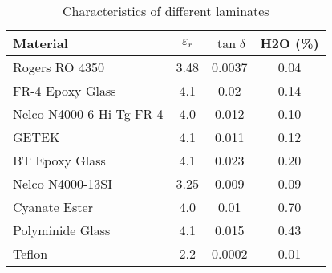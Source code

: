 \small{
\begin{table}
\caption{Characteristics of different laminates}
\begin{tabular}{l|c|c|c}
\toprule
Material & $\varepsilon_r$ & $\tan{\delta}$ & H2O (\%) \\
\midrule
\hline
Rogers RO 4350 & 3.48 & 0.0037 & 0.04  \\
FR-4 Epoxy Glass & 4.1 & 0.02 & 0.14 \\
Nelco N4000-6 Hi Tg FR-4 & 4.0 & 0.012 & 0.10 \\
GETEK & 4.1 & 0.011 & 0.12 \\
BT Epoxy Glass & 4.1 & 0.023 & 0.20 \\
Nelco N4000-13SI & 3.25 & 0.009 & 0.09 \\
Cyanate Ester & 4.0 & 0.01 & 0.70 \\
Polyminide Glass & 4.1 & 0.015 & 0.43 \\
Teflon & 2.2 & 0.0002 & 0.01 \\
\bottomrule
\end{tabular}
\end{table}}